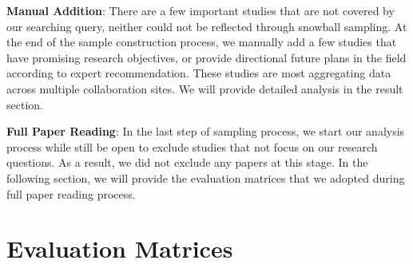 \textbf{Manual Addition}: There are a few important studies that are not covered by our searching query, neither could not be reflected through snowball sampling. At the end of the sample construction process, we manually add a few studies that have promising research objectives, or provide directional future plans in the field according to expert recommendation. These studies are most aggregating data across multiple collaboration sites. We will provide detailed analysis in the result section.

\textbf{Full Paper Reading}: In the last step of sampling process, we start our analysis process while still be open to exclude studies that not focus on our research questions. As a result, we did not exclude any papers at this stage. In the following section, we will provide the evaluation matrices that we adopted during full paper reading process. 

\section{Evaluation Matrices}

